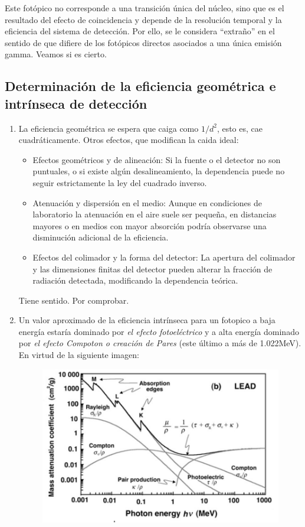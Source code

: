 \documentclass[11pt]{article}
\begin{document}
\begin{enumerate}[label=\alph*)]
    Este fotópico no corresponde a una transición única del núcleo, sino que es el resultado del efecto de coincidencia y depende de la resolución temporal y la eficiencia del sistema de detección. Por ello, se le considera “extraño” en el sentido de que difiere de los fotópicos directos asociados a una única emisión gamma. \textcolor{BrickRed}{Veamos si es cierto.}
\end{enumerate}

\subsection{Determinación de la eficiencia geométrica e intrínseca de detección}

\begin{enumerate}[label=\alph*)]
    \item La eficiencia geométrica se espera que caiga como $1/d^2$, esto es, cae cuadráticamente. Otros efectos, que modifican la caida ideal:
    \begin{itemize}
    \item  Efectos geométricos y de alineación: Si la fuente o el detector no son puntuales, o si existe algún desalineamiento, la dependencia puede no seguir estrictamente la ley del cuadrado inverso.
    \item Atenuación y dispersión en el medio: Aunque en condiciones de laboratorio la atenuación en el aire suele ser pequeña, en distancias mayores o en medios con mayor absorción podría observarse una disminución adicional de la eficiencia.
    \item Efectos del colimador y la forma del detector: La apertura del colimador y las dimensiones finitas del detector pueden alterar la fracción de radiación detectada, modificando la dependencia teórica.   
    \end{itemize} 
    \textcolor{BrickRed}{Tiene sentido. Por comprobar.}
    \item Un valor aproximado de la eficiencia intrínseca para un fotopico a baja energía estaría dominado por \textit{el efecto fotoeléctrico} y a alta energía dominado por \textit{el efecto Compoton o creación de Pares} (este último a más de 1.022MeV). En virtud de la siguiente imagen:
    \begin{figure}[h!] \centering
        \includegraphics[width=0.5\linewidth]{Mass_Atenuacion.png}
    \end{figure}


\end{enumerate}
\end{document}
